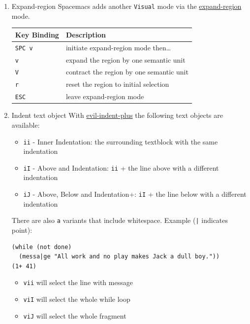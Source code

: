 \documentclass[11pt]{article}
\begin{document}
\begin{enumerate}
\item Expand-region
\label{sec:orgb53a718}
Spacemacs adds another \texttt{Visual} mode via the \href{https://github.com/magnars/expand-region.el}{expand-region} mode.

\begin{center}
\begin{tabular}{ll}
Key Binding & Description\\
\hline
\texttt{SPC v} & initiate expand-region mode then\ldots{}\\
\texttt{v} & expand the region by one semantic unit\\
\texttt{V} & contract the region by one semantic unit\\
\texttt{r} & reset the region to initial selection\\
\texttt{ESC} & leave expand-region mode\\
\end{tabular}
\end{center}

\item Indent text object
\label{sec:orge14ead3}
With \href{https://github.com/TheBB/evil-indent-plus}{evil-indent-plus} the following text objects are available:

\begin{itemize}
\item \texttt{ii} - Inner Indentation: the surrounding textblock with the same indentation
\item \texttt{iI} - Above and Indentation: \texttt{ii} + the line above with a different indentation
\item \texttt{iJ} - Above, Below and Indentation+: \texttt{iI} + the line below with a different indentation
\end{itemize}

There are also \texttt{a} variants that include whitespace. Example (\texttt{|} indicates point):

\begin{verbatim}
(while (not done)
  (messa|ge "All work and no play makes Jack a dull boy."))
(1+ 41)
\end{verbatim}

\begin{itemize}
\item \texttt{vii} will select the line with message
\item \texttt{viI} will select the whole while loop
\item \texttt{viJ} will select the whole fragment
\end{itemize}
\end{enumerate}
\end{document}
